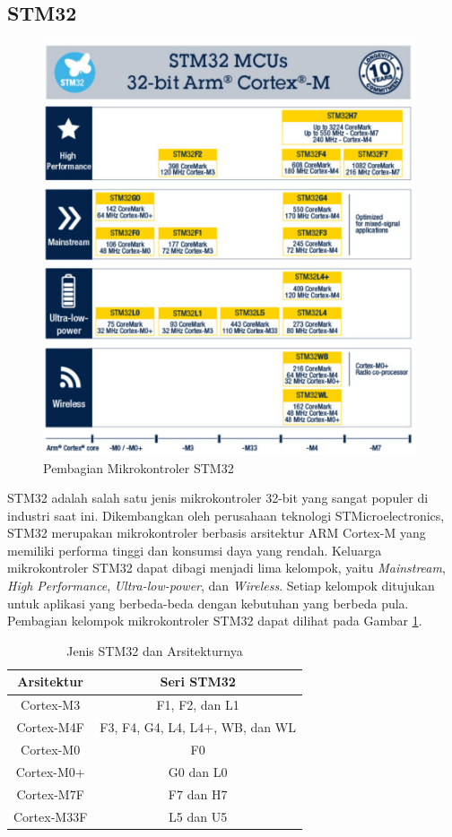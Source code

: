 \subsection{STM32}
\begin{figure}[H]
	\centering
	\includegraphics[width=11cm]{contents/chapter-2/stm-32-groups.png}
	\caption{Pembagian Mikrokontroler STM32 \cite{STMicroelectronics2023}}
	\label{Fig: stm32-groups}
\end{figure}

STM32 adalah salah satu jenis mikrokontroler 32-bit yang sangat populer di industri saat ini. Dikembangkan oleh perusahaan teknologi STMicroelectronics, STM32 merupakan mikrokontroler berbasis arsitektur ARM Cortex-M yang memiliki performa tinggi dan konsumsi daya yang rendah. Keluarga mikrokontroler STM32 dapat dibagi menjadi lima kelompok, yaitu \textit{Mainstream}, \textit{High Performance}, \textit{Ultra-low-power}, dan \textit{Wireless}. Setiap kelompok ditujukan untuk aplikasi yang berbeda-beda dengan kebutuhan yang berbeda pula. Pembagian kelompok mikrokontroler STM32 dapat dilihat pada Gambar \ref{Fig: stm32-groups}.

\begin{table}[H]
	\caption{Jenis STM32 dan Arsitekturnya}
	\vspace{0.5em}
	\centering
	\begin{tabular}{cc}
		\hline
		\textbf{Arsitektur} & \textbf{Seri STM32} \\
		\hline 
		Cortex-M3 & F1, F2, dan L1\\
		Cortex-M4F & F3, F4, G4, L4, L4+, WB, dan WL\\
		Cortex-M0 & F0\\ 
		Cortex-M0+ & G0 dan L0\\
		Cortex-M7F & F7 dan H7\\ 
		Cortex-M33F & L5 dan U5\\ \hline
	\end{tabular}
	\label{Tab: stm-arch-table}
\end{table}

